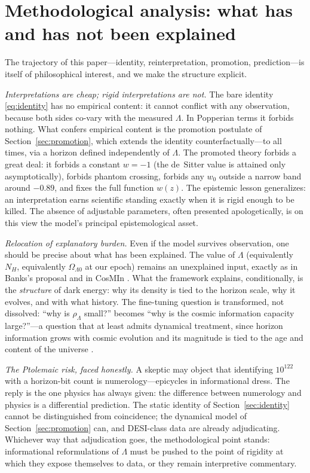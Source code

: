 \documentclass[11pt,a4paper]{article}
\begin{document}
\section{Methodological analysis: what has and has not been explained}
\label{sec:philosophy}

The trajectory of this paper---identity, reinterpretation, promotion,
prediction---is itself of philosophical interest, and we make the structure
explicit.

\emph{Interpretations are cheap; rigid interpretations are not.} The bare
identity \eqref{eq:identity} has no empirical content: it cannot conflict
with any observation, because both sides co-vary with the measured
$\Lambda$. In Popperian terms it forbids nothing. What confers empirical
content is the promotion postulate of Section~\ref{sec:promotion}, which
extends the identity counterfactually---to all times, via a horizon defined
independently of $\Lambda$. The promoted theory forbids a great deal: it
forbids a constant $w=-1$ (the de~Sitter value is attained only
asymptotically), forbids phantom crossing, forbids any $w_0$ outside a
narrow band around $-0.89$, and fixes the full function $w(z)$. The epistemic
lesson generalizes: an interpretation earns scientific standing exactly when
it is rigid enough to be killed. The absence of adjustable parameters, often
presented apologetically, is on this view the model's principal
epistemological asset.

\emph{Relocation of explanatory burden.} Even if the model survives
observation, one should be precise about what has been explained. The value
of $\Lambda$ (equivalently $N_H$, equivalently $\Omega_{\Lambda0}$ at our
epoch) remains an unexplained input, exactly as in Banks's proposal
\citep{Banks2000} and in CosMIn \citep{CosMIn2013}. What the framework
explains, conditionally, is the \emph{structure} of dark energy: why its
density is tied to the horizon scale, why it evolves, and with what history.
The fine-tuning question is transformed, not dissolved: ``why is
$\rho_\Lambda$ small?'' becomes ``why is the cosmic information capacity
large?''---a question that at least admits dynamical treatment, since
horizon information grows with cosmic evolution and its magnitude is tied to
the age and content of the universe \citep{Lloyd2002,EganLineweaver2010}.

\emph{The Ptolemaic risk, faced honestly.} A skeptic may object that
identifying $10^{122}$ with a horizon-bit count is numerology---epicycles in
informational dress. The reply is the one physics has always given: the
difference between numerology and physics is a differential prediction. The
static identity of Section~\ref{sec:identity} cannot be distinguished from
coincidence; the dynamical model of Section~\ref{sec:promotion} can, and
DESI-class data are already adjudicating. Whichever way that adjudication
goes, the methodological point stands: informational reformulations of
$\Lambda$ must be pushed to the point of rigidity at which they expose
themselves to data, or they remain interpretive commentary.
\end{document}
